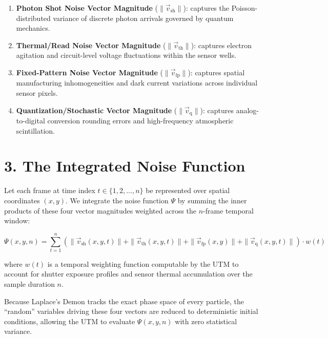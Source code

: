 \begin{enumerate}
\item \textbf{Photon Shot Noise Vector Magnitude} (\(\|\vec{v}_{\text{sh}}\|\)): captures the Poisson-distributed variance of discrete photon arrivals governed by quantum mechanics.
\item \textbf{Thermal/Read Noise Vector Magnitude} (\(\|\vec{v}_{\text{th}}\|\)): captures electron agitation and circuit-level voltage fluctuations within the sensor wells.
\item \textbf{Fixed-Pattern Noise Vector Magnitude} (\(\|\vec{v}_{\text{fp}}\|\)): captures spatial manufacturing inhomogeneities and dark current variations across individual sensor pixels.
\item \textbf{Quantization/Stochastic Vector Magnitude} (\(\|\vec{v}_{\text{q}}\|\)): captures analog-to-digital conversion rounding errors and high-frequency atmospheric scintillation.
\end{enumerate}

\section{\texorpdfstring{3. The Integrated Noise Function}{3. The Integrated Noise Function}}

Let each frame at time index \(t \in \{1, 2, \dots, n\}\) be represented over spatial coordinates \((x, y)\). We integrate the noise function \(\Psi\) by summing the inner products of these four vector magnitudes weighted across the \(n\)-frame temporal window:

\[
\Psi(x, y, n) = \sum_{t=1}^{n} \left( \|\vec{v}_{\text{sh}}(x,y,t)\| + \|\vec{v}_{\text{th}}(x,y,t)\| + \|\vec{v}_{\text{fp}}(x,y)\| + \|\vec{v}_{\text{q}}(x,y,t)\| \right) \cdot w(t)
\]

where \(w(t)\) is a temporal weighting function computable by the UTM to account for shutter exposure profiles and sensor thermal accumulation over the sample duration \(n\).

Because Laplace's Demon tracks the exact phase space of every particle, the “random” variables driving these four vectors are reduced to deterministic initial conditions, allowing the UTM to evaluate \(\Psi(x, y, n)\) with zero statistical variance.
